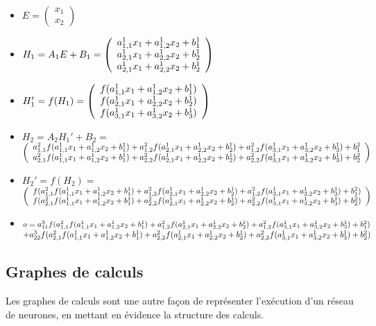 \documentclass[11pt,a4paper]{article}
\begin{document}
\begin{itemize}
 
	\item  $E = \left( \begin{array}{c} x_1 \\ x_2 \end{array} \right)$
 
	\item $H_1 = A_1 E + B_1= \left( \begin{array}{c} \h{1}{1} \\ \h{1}{2} \\ \h{1}{2} \end{array} \right)$
 
	\item $H_1' = f(H_1) = \left( \begin{array}{c} f(\h{1}{1}) \\ f(\h{1}{2}) \\ f(\h{1}{3}) \end{array} \right)$
 
	\item $H_2 = A_2 H_1' +B_2 =$\\
	$\left( \begin{array}{c} 
	\hbig{2}{1}{f(\h{1}{1})}{f(\h{1}{2})}{f(\h{1}{3})} \\
	\hbig{2}{2}{f(\h{1}{1})}{f(\h{1}{2})}{f(\h{1}{3})} 
	\end{array} \right)$
	
	\item $H_2' = f(H_2) = $\\
	$\left( \begin{array}{c} 
	f(\hbig{2}{1}{f(\h{1}{1})}{f(\h{1}{2})}{f(\h{1}{3})}) \\
	f(\hbig{2}{2}{f(\h{1}{1})}{f(\h{1}{2})}{f(\h{1}{3})})
	\end{array} \right)$

	\item 
	$o = a^{3}_{11}f(\hbig{2}{1}{f(\h{1}{1})}{f(\h{1}{2})}{f(\h{1}{3})})$ \\
	$+ a^{3}_{22} f(\hbig{2}{2}{f(\h{1}{1})}{f(\h{1}{2})}{f(\h{1}{3})})$

\end{itemize}

\subsection{Graphes de calculs}

Les graphes de calculs sont une autre façon de représenter l'exécution d'un réseau de neurones, en mettant en évidence la structure des calculs.
\end{document}
